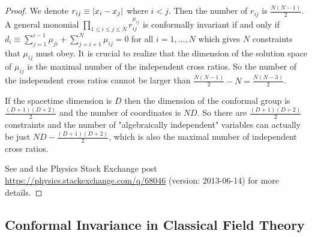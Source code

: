 \documentclass[10pt]{article}
\begin{document}
\begin{proof}
    We denote $r_{ij}\equiv\abs{x_i-x_j}$ where $i<j$.
    Then the number of $r_{ij}$ is $\frac{N(N-1)}{2}$.
    A general monomial $\prod_{1\leq i\leq j\leq N}r^{\mu_{ij}}_{ij}$ is conformally invariant if and only if $d_i\equiv\sum^{i-1}_{j=1}\mu_{ji}+\sum^N_{j=i+1}\mu_{ij}=0$ for all $i=1,\dots,N$ which gives $N$ constraints that $\mu_{ij}$ must obey.
    It is crucial to realize that the dimension of the solution space of $\mu_{ij}$ is the maximal number of the independent cross ratios\snm.
    So the number of the independent cross ratios cannot be larger than $\frac{N(N-1)}{2}-N=\frac{N(N-3)}{2}$.

    If the spacetime dimension is $D$ then the dimension of the conformal group is $\frac{(D+1)(D+2)}{2}$ and the number of coordinates is $ND$.
    So there are $\frac{(D+1)(D+2)}{2}$ constraints and the number of "algebraically independent" variables can actually be just $ND-\frac{(D+1)(D+2)}{2}$, which is also the maximal number of independent cross ratios.

    See \cite{Ginsparg:1988ui} and the Physics Stack Exchange post \url{https://physics.stackexchange.com/q/68046} (version: 2013-06-14) for more details.
\end{proof}

\subsection{Conformal Invariance in Classical Field Theory}
\end{document}
